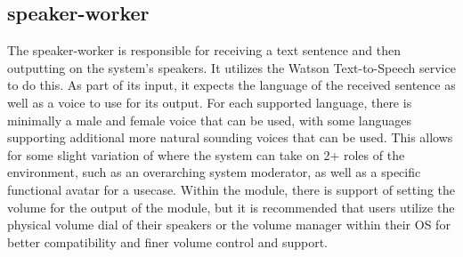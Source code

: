 \subsection{speaker-worker}

The speaker-worker is responsible for receiving a text sentence and then outputting on the
system's speakers. It utilizes the Watson Text-to-Speech service to do this. As part of its
input, it expects the language of the received sentence as well as a voice to use for its
output. For each supported language, there is minimally a male and female voice that can
be used, with some languages supporting additional more natural sounding voices that can
be used. This allows for some slight variation of where the system can take on 2+ roles
of the environment, such as an overarching system moderator, as well as a specific
functional avatar for a usecase. Within the module, there is support of setting the volume
for the output of the module, but it is recommended that users utilize the physical volume
dial of their speakers or the volume manager within their OS for better compatibility and
finer volume control and support.
